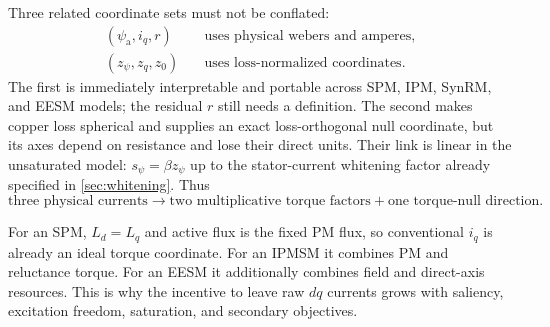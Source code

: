 Three related coordinate sets must not be conflated:
\begin{align*}
 (\psi_{\mathrm a},i_q,r)&\quad\text{uses physical webers and amperes},\\
 (z_\psi,z_q,z_0)&\quad\text{uses loss-normalized coordinates}.
\end{align*}
The first is immediately interpretable and portable across SPM, IPM, SynRM,
and EESM models; the residual \(r\) still needs a definition. The second makes
copper loss spherical and supplies an exact loss-orthogonal null coordinate,
but its axes depend on resistance and lose their direct units. Their link is
linear in the unsaturated model:
\(s_\psi=\beta z_\psi\) up to the stator-current whitening factor already
specified in \cref{sec:whitening}. Thus
\[
 \boxed{\text{three physical currents}
 \longrightarrow\text{two multiplicative torque factors}
 +\text{one torque-null direction}.}
\]

For an SPM, \(L_d=L_q\) and active flux is the fixed PM flux, so conventional
\(i_q\) is already an ideal torque coordinate. For an IPMSM it combines PM and
reluctance torque. For an EESM it additionally combines field and direct-axis
resources. This is why the incentive to leave raw \(dq\) currents grows with
saliency, excitation freedom, saturation, and secondary objectives.
